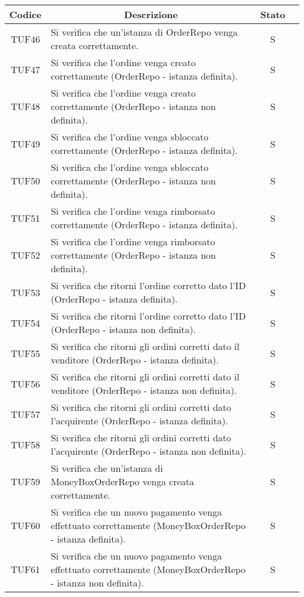 \begin{table}[H]
  \centering
  \renewcommand{\arraystretch}{1.8}
  \begin{tabular}{c|p{8cm}|c|c}
    \rowcolor[HTML]{125E28}
    \color[HTML]{FFFFFF}\textbf{Codice}
          & \multicolumn{1}{c}{\color[HTML]{FFFFFF}\textbf{Descrizione}}
          & \color[HTML]{FFFFFF}\textbf{Stato}                                                                                \\
    \hline
    TUF46 & Si verifica che un'istanza di OrderRepo venga creata correttamente.                                           & S \\
    TUF47 & Si verifica che l'ordine venga creato correttamente (OrderRepo - istanza definita).                           & S \\
    TUF48 & Si verifica che l'ordine venga creato correttamente (OrderRepo - istanza non definita).                       & S \\
    TUF49 & Si verifica che l'ordine venga sbloccato correttamente (OrderRepo - istanza definita).                        & S \\
    TUF50 & Si verifica che l'ordine venga sbloccato correttamente (OrderRepo - istanza non definita).                    & S \\
    TUF51 & Si verifica che l'ordine venga rimborsato correttamente (OrderRepo - istanza definita).                       & S \\
    TUF52 & Si verifica che l'ordine venga rimborsato correttamente (OrderRepo - istanza non definita).                   & S \\
    TUF53 & Si verifica che ritorni l'ordine corretto dato l'ID (OrderRepo - istanza definita).                           & S \\
    TUF54 & Si verifica che ritorni l'ordine corretto dato l'ID (OrderRepo - istanza non definita).                       & S \\
    TUF55 & Si verifica che ritorni gli ordini corretti dato il venditore (OrderRepo - istanza definita).                 & S \\
    TUF56 & Si verifica che ritorni gli ordini corretti dato il venditore (OrderRepo - istanza non definita).             & S \\
    TUF57 & Si verifica che ritorni gli ordini corretti dato l'acquirente (OrderRepo - istanza definita).                 & S \\
    TUF58 & Si verifica che ritorni gli ordini corretti dato l'acquirente (OrderRepo - istanza non definita).             & S \\
    TUF59 & Si verifica che un'istanza di MoneyBoxOrderRepo venga creata correttamente.                                   & S \\
    TUF60 & Si verifica che un nuovo pagamento venga effettuato correttamente (MoneyBoxOrderRepo - istanza definita).     & S \\
    TUF61 & Si verifica che un nuovo pagamento venga effettuato correttamente (MoneyBoxOrderRepo - istanza non definita). & S \\
  \end{tabular}
\end{table}
